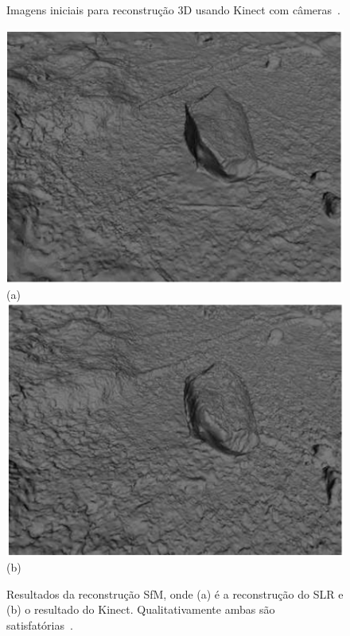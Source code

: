 \begin{figure}[!h]
	\centering
	\caption{%
	Imagens iniciais para reconstrução 3D usando Kinect com câmeras~\cite{smisek20133d}.
	}\label{fig:resultadoKinect1}
\end{figure}

\newpage

\begin{figure}[!h]
	\centering
	\includegraphics[width=0.3\linewidth]{figs/imagemMVS.png}(a)
	\includegraphics[width=0.3\linewidth]{figs/imagemMVSKinect.png}(b)
	\caption{%
	Resultados da reconstrução SfM, onde (a) é a reconstrução do SLR e (b) o resultado do Kinect. Qualitativamente ambas são satisfatórias~\cite{smisek20133d}.
	}\label{fig:resultadoKinect2}
\end{figure}

